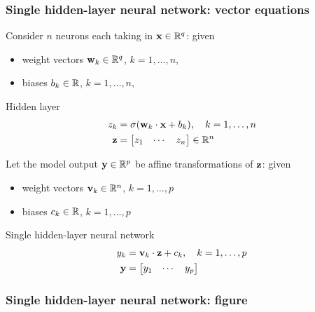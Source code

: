 \begin{frame}
    \frametitle{Single hidden-layer neural network: vector equations}

    Consider $n$ neurons each taking in $\mathbf{x} \in \mathbb{R}^q$: given
    \begin{itemize}
        \item weight vectors $\mathbf{w}_k \in \mathbb{R}^q$, $k = 1, \ldots, n$,
        \item biases $b_k \in \mathbb{R}$, $k = 1, \ldots, n$,
    \end{itemize}
    \begin{block}{Hidden layer}
        \vspace{-1em}
        \begin{align*}
            z_k &= \sigma(\mathbf{w}_k \cdot \mathbf{x} + b_k), \quad k = 1, \ldots, n \\
            \mathbf{z} &= \begin{bmatrix} z_1 & \cdots & z_n \end{bmatrix} \in \mathbb{R}^n
        \end{align*}
    \end{block}
    \pause

    Let the model output $\mathbf{y} \in \mathbb{R}^p$ be affine transformations of $\mathbf{z}$: given
    \begin{itemize}
        \item weight vectors $\mathbf{v}_k \in \mathbb{R}^n$, $k = 1, \ldots, p$
        \item biases $c_k \in \mathbb{R}$, $k = 1, \ldots, p$
    \end{itemize}
    \begin{block}{Single hidden-layer neural network}
        \vspace{-1em}
        \begin{align*}
            y_k &= \mathbf{v}_k \cdot \mathbf{z} + c_k, \quad k = 1, \ldots, p \\
            \mathbf{y} &= \begin{bmatrix} y_1 & \cdots & y_p \end{bmatrix}
        \end{align*}
    \end{block}
\end{frame}

\begin{frame}
    \frametitle{Single hidden-layer neural network: figure}

    \centering
    
\end{frame}

